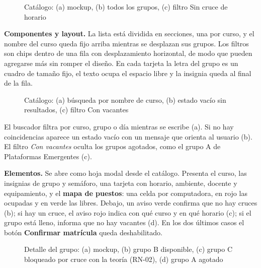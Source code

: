 \begin{figure}[!htbp]
\centering
{}
\caption{Catálogo: (a) mockup, (b) todos los grupos, (c) filtro Sin cruce de horario}
\label{fig:i03}
\end{figure}

\textbf{Componentes y layout.} La lista está dividida en secciones, una por curso, y el nombre del curso queda fijo arriba mientras se desplazan sus grupos. Los filtros son chips dentro de una fila con desplazamiento horizontal, de modo que pueden agregarse más sin romper el diseño. En cada tarjeta la letra del grupo es un cuadro de tamaño fijo, el texto ocupa el espacio libre y la insignia queda al final de la fila.

\begin{figure}[!htbp]
\centering
{}
\caption{Catálogo: (a) búsqueda por nombre de curso, (b) estado vacío sin resultados, (c) filtro Con vacantes}
\label{fig:x03}
\end{figure}

El buscador filtra por curso, grupo o día mientras se escribe (a). Si no hay coincidencias aparece un estado vacío con un mensaje que orienta al usuario (b). El filtro \textit{Con vacantes} oculta los grupos agotados, como el grupo A de Plataformas Emergentes (c).


\textbf{Elementos.} Se abre como hoja modal desde el catálogo. Presenta el curso, las insignias de grupo y semáforo, una tarjeta con horario, ambiente, docente y equipamiento, y el \textbf{mapa de puestos}: una celda por computadora, en rojo las ocupadas y en verde las libres. Debajo, un aviso verde confirma que no hay cruces (b); si hay un cruce, el aviso rojo indica con qué curso y en qué horario (c); si el grupo está lleno, informa que no hay vacantes (d). En los dos últimos casos el botón \textbf{Confirmar matrícula} queda deshabilitado.

\begin{figure}[!htbp]
\centering
{}
\caption{Detalle del grupo: (a) mockup, (b) grupo B disponible, (c) grupo C bloqueado por cruce con la teoría (RN-02), (d) grupo A agotado}
\label{fig:i04}
\end{figure}


